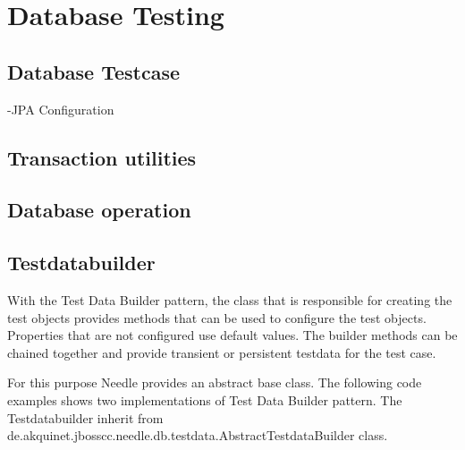 \chapter{Database Testing}

\section{Database Testcase}
-JPA Configuration


\section{Transaction utilities}

\section{Database operation}


\section{Testdatabuilder}

With the Test Data Builder pattern, the class that is responsible for creating the test objects provides methods that can be used to configure the test objects. Properties that are not configured use default values. The builder methods can be chained together and provide transient or persistent testdata for the test case.

For this purpose Needle provides an abstract base class. The following code examples shows two implementations of Test Data Builder pattern. The Testdatabuilder inherit from 
de.akquinet.jbosscc.needle.db.testdata.\-AbstractTestdataBuilder class. 

